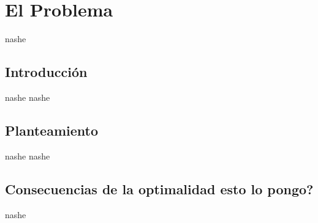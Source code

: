 \section{El Problema}

nashe

\subsection{Introducción}

nashe nashe

\subsection{Planteamiento}

nashe nashe

\subsection{Consecuencias de la optimalidad esto lo pongo?}

nashe